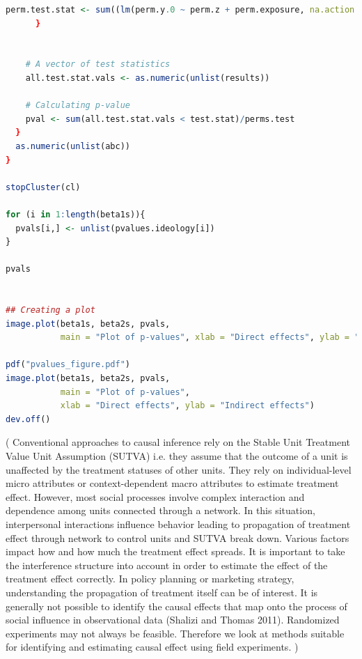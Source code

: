 \documentclass[12pt]{article}
\begin{document}
\begin{lstlisting}[language=R]
      perm.test.stat <- sum((lm(perm.y.0 ~ perm.z + perm.exposure, na.action = na.omit)$resid)^2)
      }
    
    
    # A vector of test statistics
    all.test.stat.vals <- as.numeric(unlist(results))
    
    # Calculating p-value
    pval <- sum(all.test.stat.vals < test.stat)/perms.test
  }
  as.numeric(unlist(abc))
}

stopCluster(cl)

for (i in 1:length(beta1s)){
  pvals[i,] <- unlist(pvalues.ideology[i])
}

pvals


## Creating a plot
image.plot(beta1s, beta2s, pvals,
           main = "Plot of p-values", xlab = "Direct effects", ylab = "Indirect effects")

pdf("pvalues_figure.pdf")
image.plot(beta1s, beta2s, pvals,
           main = "Plot of p-values",
           xlab = "Direct effects", ylab = "Indirect effects")
dev.off()


\end{lstlisting}

(
Conventional approaches to causal inference rely on the Stable Unit Treatment Value Unit Assumption (SUTVA) i.e. they assume that the outcome of a unit is unaffected by the treatment statuses of other units. They rely on individual-level micro attributes or context-dependent macro attributes to estimate treatment effect. However, most social processes involve complex interaction and dependence among units connected through a network. In this situation, interpersonal interactions influence behavior leading to propagation of treatment effect through network to control units and SUTVA break down. Various factors impact how and how much the treatment effect spreads. It is important to take the interference structure into account in order to estimate the effect of the treatment effect correctly. In policy planning or marketing strategy, understanding the propagation of treatment itself can be of interest. It is generally not possible to identify the causal effects that map onto the process of social influence in observational data (Shalizi and Thomas 2011). Randomized experiments may not always be feasible. Therefore we look at methods suitable for identifying and estimating causal effect using field experiments.
)


\clearpage


\end{document}
